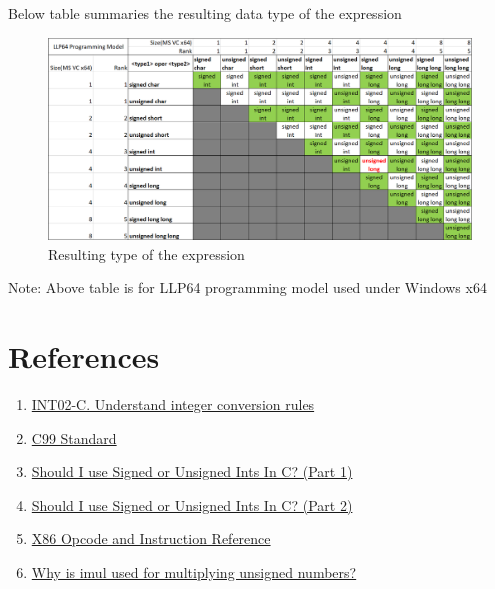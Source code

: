 \documentclass{article}
\begin{document}
Below table summaries the resulting data type of the expression
\begin{figure}[H]
\centering
\includegraphics[width=\textwidth]{Resulting-Datatypes.png}
\caption{Resulting type of the expression}
\end{figure}

Note: Above table is for LLP64 programming model used under Windows x64

\section{References}
\begin{enumerate}[noitemsep]
\item \href{https://wiki.sei.cmu.edu/confluence/display/c/INT02-C.+Understand+integer+conversion+rules}{INT02-C. Understand integer conversion rules}
\item \href{http://www.open-std.org/jtc1/sc22/wg14/www/docs/n1256.pdf}{C99 Standard}
\item \href{http://blog.robertelder.org/signed-or-unsigned/}{Should I use Signed or Unsigned Ints In C? (Part 1)}
\item \href{http://blog.robertelder.org/signed-or-unsigned-part-2/}{Should I use Signed or Unsigned Ints In C? (Part 2)}
\item \href{http://ref.x86asm.net/coder-abc.html}{X86 Opcode and Instruction Reference}
\item \href{https://stackoverflow.com/a/42589535/2407966}{Why is imul used for multiplying unsigned numbers?}

\end{enumerate}
\end{document}
